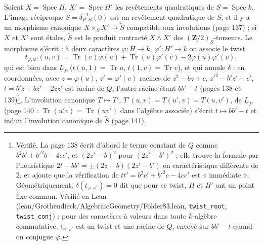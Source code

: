 \documentclass[11pt,a4paper]{article}
\begin{document}
Soient $X = \operatorname{Spec}H$, $X' = \operatorname{Spec}H'$ les revêtements
quadratiques de $S = \operatorname{Spec}k$. L'image réciproque
$\widetilde{S} = \delta_{P,B}^{-1}(0)$ est un revêtement quadratique de $S$, et
il y a un morphisme canonique $X \times_S X' \to \widetilde{S}$ compatible aux
involutions (page 137) ; si $X$ et $X'$ sont étales, $\widetilde{S}$ est le
produit contracté $X \wedge X'$ des $(\mathbf{Z}/2)_S$-torseurs. Le morphisme
s'écrit : à deux caractères $\varphi : H \to k$, $\varphi' : H' \to k$ on
associe le twist
\[
  t_{\varphi, \varphi'}(u, v) = \operatorname{Tr}(v)\varphi(u) +
  \operatorname{Tr}(u)\varphi'(v) - 2\varphi(u)\varphi'(v),
\]
qui est bien dans $\underline{L}_P$ ($t(u, 1) = \operatorname{Tr}u$, $t(1, v)
= \operatorname{Tr}v$), et qui annule $\delta$ : en coordonnées, avec $z =
\varphi(u)$, $z' = \varphi'(v)$ racines de $z^2 - bz + c$, $z'^2 - b'z' + c'$,
$t = b'z + bz' - 2zz'$ est racine de $Q$, l'autre racine étant $bb' - t$ (pages
138 et 139)\footnote{Vérifié. La page 138 écrit d'abord le terme constant de $Q$
comme $b^2b' + b'^2b - 4cc'$, et $(2z' - b)^2$ pour $(2z' - b')^2$ ; elle trouve
la formule par l'heuristique $2t - bb' = \pm(2z - b)(2z' - b')$ en
caractéristique différente de $2$, et ajoute que la vérification de $tt' =
b^2c' + b'^2c - 4cc'$ est « immédiate ». Géométriquement, $\delta(t_{\varphi,
\varphi'}) = 0$ dit que pour ce twist, $H$ et $H'$ ont un point fixe commun.
Vérifié en Lean (lean/Grothendieck/AlgebraicGeometry/Folder83.lean, \texttt{twist\_root},
\texttt{twist\_conj}) : pour des caractères à valeurs dans toute $k$-algèbre
commutative, $t_{\varphi, \varphi'}$ est un twist et une racine de $Q$, envoyé
sur $bb' - t$ quand on conjugue $\varphi$.}.
L'involution canonique $T \mapsto T'$, $T'(u, v) = T(u', v) = T(u, v')$, de
$\underline{L}_P$ (page 140 : $\operatorname{Tr}(u'v) = \operatorname{Tr}(uv')$
dans l'algèbre associée) s'écrit $t \mapsto bb' - t$ et induit l'involution
canonique de $\widetilde{S}$ (page 141).
\end{document}
